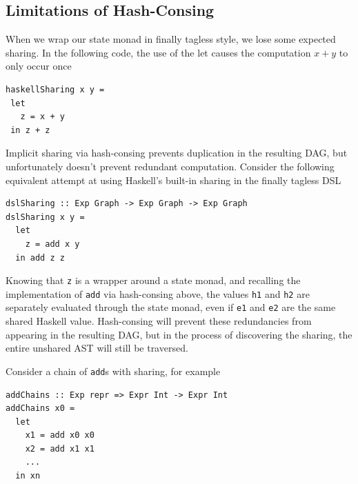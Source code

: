 \documentclass[runningheads]{llncs}
\begin{document}
\subsection{Limitations of Hash-Consing} \label{limithashcons}

When we wrap our state monad in finally tagless style, we lose some expected
sharing. In the following code, the use of the let causes the computation
$x + y$ to only occur once
\begin{verbatim}
haskellSharing x y =
 let
   z = x + y
 in z + z
\end{verbatim}

Implicit sharing via hash-consing prevents duplication in the resulting DAG, but
unfortunately doesn't prevent redundant computation. Consider the following
equivalent attempt at using Haskell's built-in sharing in the finally tagless DSL
\begin{verbatim}
dslSharing :: Exp Graph -> Exp Graph -> Exp Graph
dslSharing x y =
  let
    z = add x y
  in add z z
\end{verbatim}
Knowing that \texttt{z} is a wrapper around a state monad,
and recalling the implementation of
\texttt{add} via hash-consing above, 
the values \texttt{h1} and \texttt{h2} are
separately evaluated through the state monad, even if \texttt{e1} and \texttt{e2} are the same shared Haskell value. 
Hash-consing will prevent these redundancies from appearing in
the resulting DAG, 
but in the process of discovering the sharing, the entire unshared AST will still be traversed.

Consider a chain of \texttt{add}s  with sharing, for example
\begin{verbatim}
addChains :: Exp repr => Expr Int -> Expr Int
addChains x0 = 
  let
    x1 = add x0 x0
    x2 = add x1 x1
    ...
  in xn
\end{verbatim}
\end{document}

